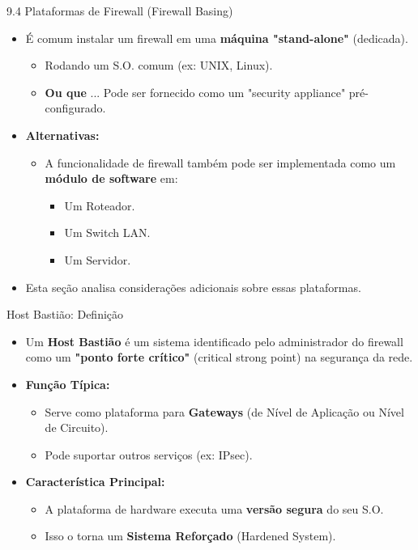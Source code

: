 \begin{frame}{9.4 Plataformas de Firewall (Firewall Basing)}
    \begin{itemize}
        \item É comum instalar um firewall em uma \textbf{máquina "stand-alone"} (dedicada).
              \begin{itemize}
                  \item Rodando um S.O. comum (ex: UNIX, Linux).
                  \item \textbf{Ou que} ... Pode ser fornecido como um "security appliance" pré-configurado.
              \end{itemize}

        \item \textbf{Alternativas:}
              \begin{itemize}
                  \item A funcionalidade de firewall também pode ser implementada como um \textbf{módulo de software} em:
                        \begin{itemize}
                            \item Um Roteador.
                            \item Um Switch LAN.
                            \item Um Servidor.
                        \end{itemize}
              \end{itemize}

        \item Esta seção analisa considerações adicionais sobre essas plataformas.
    \end{itemize}
\end{frame}

\begin{frame}{Host Bastião: Definição}
    \begin{itemize}
        \item Um \textbf{Host Bastião} é um sistema identificado pelo administrador do firewall como um \textbf{"ponto forte crítico"} (critical strong point) na segurança da rede.

        \item \textbf{Função Típica:}
              \begin{itemize}
                  \item Serve como plataforma para \textbf{Gateways} (de Nível de Aplicação ou Nível de Circuito).
                  \item Pode suportar outros serviços (ex: IPsec).
              \end{itemize}

        \item \textbf{Característica Principal:}
              \begin{itemize}
                  \item A plataforma de hardware executa uma \textbf{versão segura} do seu S.O.
                  \item Isso o torna um \textbf{Sistema Reforçado} (Hardened System).
              \end{itemize}
    \end{itemize}
\end{frame}

